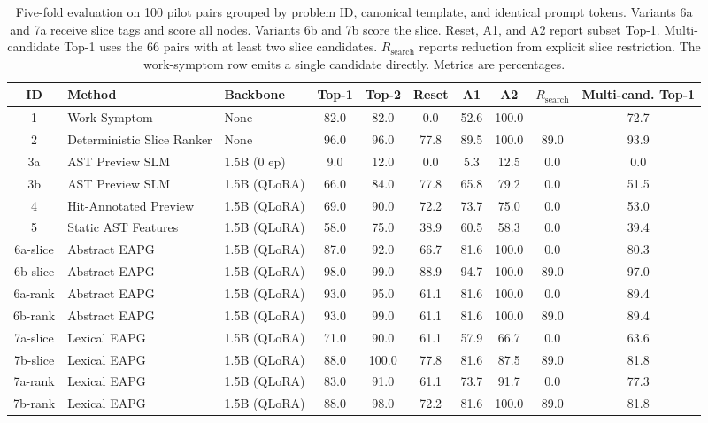\begin{table}[t]
\centering
\small
\caption{Five-fold evaluation on 100 pilot pairs grouped by problem ID, canonical template, and identical prompt tokens. Variants 6a and 7a receive slice tags and score all nodes. Variants 6b and 7b score the slice. Reset, A1, and A2 report subset Top-1. Multi-candidate Top-1 uses the 66 pairs with at least two slice candidates. $R_{\text{search}}$ reports reduction from explicit slice restriction. The work-symptom row emits a single candidate directly. Metrics are percentages.}
\label{tab:ablation_results}
\setlength{\tabcolsep}{4pt}
\begin{tabular}{@{}cllccccccc@{}}
\toprule
\textbf{ID} & \textbf{Method} & \textbf{Backbone} & \textbf{Top-1} & \textbf{Top-2} & \textbf{Reset} & \textbf{A1} & \textbf{A2} & \textbf{$R_{\text{search}}$} & \textbf{Multi-cand. Top-1} \\
\midrule
1 & Work Symptom & None & 82.0 & 82.0 & 0.0 & 52.6 & 100.0 & -- & 72.7 \\
2 & Deterministic Slice Ranker & None & 96.0 & 96.0 & 77.8 & 89.5 & 100.0 & 89.0 & 93.9 \\
\midrule
3a & AST Preview SLM & 1.5B (0 ep) & 9.0 & 12.0 & 0.0 & 5.3 & 12.5 & 0.0 & 0.0 \\
3b & AST Preview SLM & 1.5B (QLoRA) & 66.0 & 84.0 & 77.8 & 65.8 & 79.2 & 0.0 & 51.5 \\
4 & Hit-Annotated Preview & 1.5B (QLoRA) & 69.0 & 90.0 & 72.2 & 73.7 & 75.0 & 0.0 & 53.0 \\
5 & Static AST Features & 1.5B (QLoRA) & 58.0 & 75.0 & 38.9 & 60.5 & 58.3 & 0.0 & 39.4 \\
\midrule
6a-slice & Abstract EAPG & 1.5B (QLoRA) & 87.0 & 92.0 & 66.7 & 81.6 & 100.0 & 0.0 & 80.3 \\
6b-slice & Abstract EAPG & 1.5B (QLoRA) & 98.0 & 99.0 & 88.9 & 94.7 & 100.0 & 89.0 & 97.0 \\
6a-rank & Abstract EAPG & 1.5B (QLoRA) & 93.0 & 95.0 & 61.1 & 81.6 & 100.0 & 0.0 & 89.4 \\
6b-rank & Abstract EAPG & 1.5B (QLoRA) & 93.0 & 99.0 & 61.1 & 81.6 & 100.0 & 89.0 & 89.4 \\
7a-slice & Lexical EAPG & 1.5B (QLoRA) & 71.0 & 90.0 & 61.1 & 57.9 & 66.7 & 0.0 & 63.6 \\
7b-slice & Lexical EAPG & 1.5B (QLoRA) & 88.0 & 100.0 & 77.8 & 81.6 & 87.5 & 89.0 & 81.8 \\
7a-rank & Lexical EAPG & 1.5B (QLoRA) & 83.0 & 91.0 & 61.1 & 73.7 & 91.7 & 0.0 & 77.3 \\
7b-rank & Lexical EAPG & 1.5B (QLoRA) & 88.0 & 98.0 & 72.2 & 81.6 & 100.0 & 89.0 & 81.8 \\
\bottomrule
\end{tabular}
\end{table}